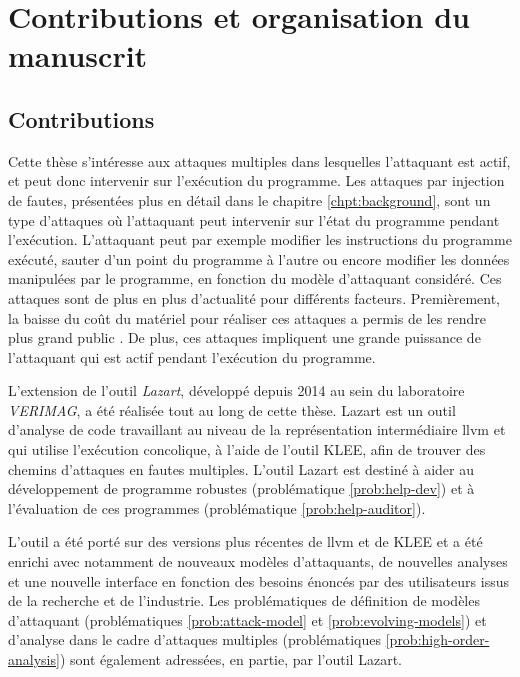     \section{Contributions et organisation du manuscrit}
    
        \subsection{Contributions} 
            
            Cette thèse s'intéresse aux attaques multiples dans lesquelles l'attaquant est actif, et peut donc intervenir sur l'exécution du programme. Les attaques par injection de fautes, présentées plus en détail dans le chapitre \ref{chpt:background}, sont un type d'attaques où l'attaquant peut intervenir sur l'état du programme pendant l'exécution. L'attaquant peut par exemple modifier les instructions du programme exécuté, sauter d'un point du programme à l'autre ou encore modifier les données manipulées par le programme, en fonction du modèle d'attaquant considéré.
            Ces attaques sont de plus en plus d'actualité pour différents facteurs. Premièrement, la baisse du coût du matériel pour réaliser ces attaques a permis de les rendre plus grand public \cite{Breier/TDSC19}. 
            De plus, ces attaques impliquent une grande puissance de l'attaquant qui est actif pendant l'exécution du programme.
        
            L'extension de l'outil \textit{Lazart}, développé depuis 2014 au sein du laboratoire \textit{VERIMAG}, a été réalisée tout au long de cette thèse. Lazart est un outil d'analyse de code travaillant au niveau de la représentation intermédiaire \gls{llvm} et qui utilise l'exécution concolique, à l'aide de l'outil KLEE, afin de trouver des chemins d'attaques en fautes multiples. 
            L'outil Lazart est destiné à aider au développement de programme robustes (problématique \ref{prob:help-dev}) et à l'évaluation de ces programmes (problématique \ref{prob:help-auditor}).
            
            L'outil a été porté sur des versions plus récentes de \gls{llvm} et de KLEE et a été enrichi avec notamment de nouveaux modèles d'attaquants, de nouvelles analyses et une nouvelle interface en fonction des besoins énoncés par des utilisateurs issus de la recherche et de l'industrie. Les problématiques de définition de modèles d'attaquant (problématiques \ref{prob:attack-model} et \ref{prob:evolving-models}) et d'analyse dans le cadre d'attaques multiples (problématiques \ref{prob:high-order-analysis}) sont également adressées, en partie, par l'outil Lazart.
            
